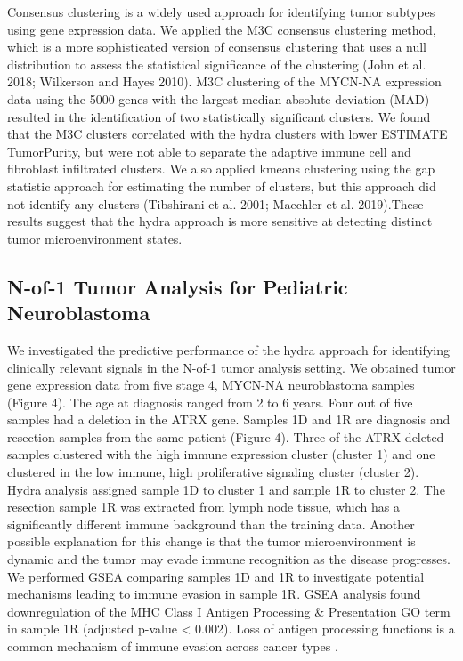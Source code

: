\documentclass[10pt,letterpaper]{article}
\begin{document}
Consensus clustering is a widely used approach for identifying tumor subtypes using gene expression data. We applied the M3C consensus clustering method, which is a more sophisticated version of consensus clustering that uses a null distribution to assess the statistical significance of the clustering (John et al. 2018; Wilkerson and Hayes 2010). M3C clustering of the MYCN-NA expression data using the 5000 genes with the largest median absolute deviation (MAD) resulted in the identification of two statistically significant clusters. We found that the M3C clusters correlated with the hydra clusters with lower ESTIMATE TumorPurity, but were not able to separate the adaptive immune cell and fibroblast infiltrated clusters. We also applied kmeans clustering using the gap statistic approach for estimating the number of clusters, but this approach did not identify any clusters (Tibshirani et al. 2001; Maechler et al. 2019).These results suggest that the hydra approach is more sensitive at detecting distinct tumor microenvironment states.

\subsection{N-of-1 Tumor Analysis for Pediatric Neuroblastoma}
We investigated the predictive performance of the hydra approach for identifying clinically relevant signals in the N-of-1 tumor analysis setting. We obtained tumor gene expression data from five stage 4, MYCN-NA neuroblastoma samples (Figure 4). The age at diagnosis ranged from 2 to 6 years. Four out of five samples had a deletion in the ATRX gene. Samples 1D and 1R are diagnosis and resection samples from the same patient (Figure 4). Three of the ATRX-deleted samples clustered with the high immune expression cluster (cluster 1) and one clustered in the low immune, high proliferative signaling cluster (cluster 2). Hydra analysis assigned sample 1D to cluster 1 and sample 1R to cluster 2. The resection sample 1R was extracted from lymph node tissue, which has a significantly different immune background than the training data. Another possible explanation for this change is that the tumor microenvironment is dynamic and the tumor may evade immune recognition as the disease progresses. We performed GSEA comparing samples 1D and 1R to investigate potential mechanisms leading to immune evasion in sample 1R. GSEA analysis found downregulation of the MHC Class I Antigen Processing \& Presentation GO term in sample 1R (adjusted p-value < 0.002). Loss of antigen processing functions is a common mechanism of immune evasion across cancer types \cite{reevesAntigenProcessingImmune2017}.
\end{document}
